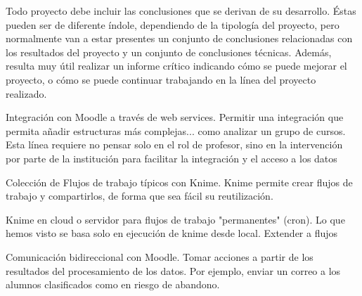 
Todo proyecto debe incluir las conclusiones que se derivan de su desarrollo. Éstas pueden ser de diferente índole, dependiendo de la tipología del proyecto, pero normalmente van a estar presentes un conjunto de conclusiones relacionadas con los resultados del proyecto y un conjunto de conclusiones técnicas. 
Además, resulta muy útil realizar un informe crítico indicando cómo se puede mejorar el proyecto, o cómo se puede continuar trabajando en la línea del proyecto realizado. 


Integración con Moodle a través de web services. 
Permitir una integración que permita añadir estructuras más complejas... como analizar un grupo de cursos. 
Esta línea requiere no pensar solo en el rol de profesor, sino en la intervención por parte de la institución para facilitar la integración y el acceso a los datos


Colección de Flujos de trabajo típicos con Knime. Knime permite crear flujos de trabajo y compartirlos, de forma que sea fácil su reutilización. 


Knime en cloud o servidor para flujos de trabajo "permanentes" (cron). Lo que hemos visto se basa solo en ejecución de knime desde local. 
Extender a flujos 

Comunicación bidireccional con Moodle. Tomar acciones a partir de los resultados del procesamiento de los datos. Por ejemplo, enviar un correo a los alumnos clasificados como en riesgo de abandono. 
